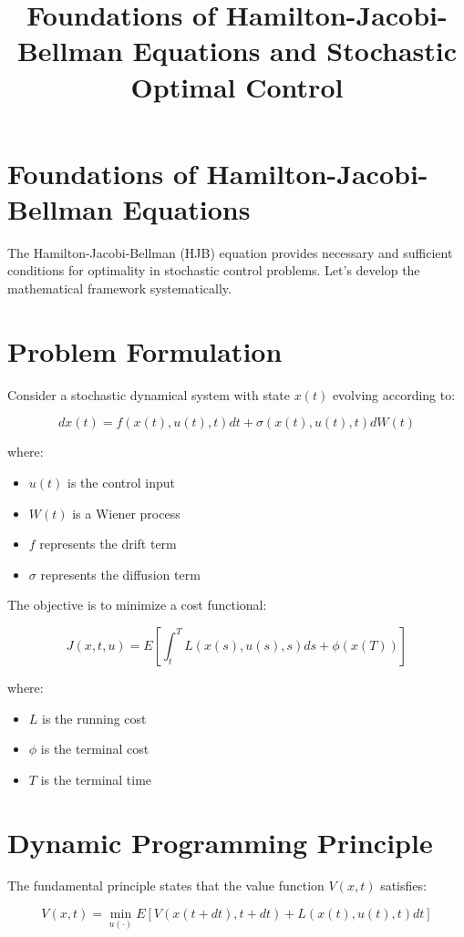 \documentclass{article}
\title{Foundations of Hamilton-Jacobi-Bellman Equations and Stochastic Optimal Control}
\author{}
\date{}
\begin{document}
\maketitle

\section{Foundations of Hamilton-Jacobi-Bellman Equations}

The Hamilton-Jacobi-Bellman (HJB) equation provides necessary and sufficient conditions for optimality in stochastic control problems. Let's develop the mathematical framework systematically.

\section{Problem Formulation}

Consider a stochastic dynamical system with state $x(t)$ evolving according to:

\[ dx(t) = f(x(t),u(t),t)dt + \sigma(x(t),u(t),t)dW(t) \]

where:
\begin{itemize}
\item $u(t)$ is the control input
\item $W(t)$ is a Wiener process
\item $f$ represents the drift term
\item $\sigma$ represents the diffusion term
\end{itemize}

The objective is to minimize a cost functional:

\[ J(x,t,u) = E\left[\int_t^T L(x(s),u(s),s)ds + \phi(x(T))\right] \]

where:
\begin{itemize}
\item $L$ is the running cost
\item $\phi$ is the terminal cost
\item $T$ is the terminal time
\end{itemize}

\section{Dynamic Programming Principle}

The fundamental principle states that the value function $V(x,t)$ satisfies:

\[ V(x,t) = \min_{u(\cdot)} E\left[V(x(t+dt),t+dt) + L(x(t),u(t),t)dt\right] \]
\end{document}
